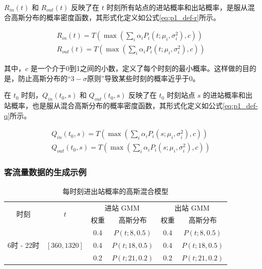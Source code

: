 \documentclass[12pt,a4paper]{mcmthesis}
\begin{document}
    $R_{in}(t)$ 和 $R_{out}(t)$ 反映了在 $t$ 时刻所有站点的进站概率和出站概率，是服从混合高斯分布的概率密度函数，其形式化定义如公式\ref{eq:p1_def-r}所示。

    \begin{equation}
        \begin{aligned}
            R_{in}(t) = T \left( \max \left( \sum_i \alpha_i P_i(t;\mu_i,\sigma^2_i), c \right) \right) \\
            R_{out}(t) = T \left( \max \left( \sum_i \alpha_i P_i(t;\mu_i,\sigma^2_i), c \right) \right)
        \end{aligned}
        \label{eq:p1_def-r}
    \end{equation}

    其中，$c$ 是一个介于0到1之间的小数，定义了每个时刻的最小概率。这样做的目的是，防止高斯分布的“$3-\sigma$原则”导致某些时刻的概率近乎于0。

    在 $t_0$ 时刻，$Q_{in}(t_0,s)$ 和 $Q_{out}(t_0,s)$ 反映了在 $t_0$ 时刻站点 $s$ 的进站概率和出站概率，也是服从混合高斯分布的概率密度函数，其形式化定义如公式\ref{eq:p1_def-q}所示。

    \begin{equation}
        \begin{aligned}
            Q_{in}(t_0,s) = T \left( \max \left( \sum_i \alpha_i P_i(s;\mu_i,\sigma^2_i), c \right) \right) \\
            Q_{out}(t_0,s) = T \left( \max \left( \sum_i \alpha_i P_i(s;\mu_i,\sigma^2_i), c \right) \right)
        \end{aligned}
        \label{eq:p1_def-q}
    \end{equation}

    \subsubsection{客流量数据的生成示例}

    \begin{table}[h]
        \centering
        \caption{每时刻进出站概率的高斯混合模型}
        \label{tab:p1_gmm-time}
        \begin{tabular}{c|c|cc|cc}
            \hline
            \multirow{2}{*}{时刻} & \multirow{2}{*}{$t$} & \multicolumn{2}{c|}{进站 GMM} & \multicolumn{2}{c}{出站 GMM} \\ \cline{3-6}
            &                         & 权重  & 高斯分布          & 权重  & 高斯分布          \\ \hline
            &                         & 0.4 & $P(t;8,0.5)$  & 0.4 & $P(t;8,0.5)$  \\
            6时 - 22时 & $\left[360,1320\right]$ & 0.4 & $P(t;18,0.5)$ & 0.4 & $P(t;18,0.5)$ \\
            &                         & 0.2 & $P(t;21,0.2)$ & 0.2 & $P(t;21,0.2)$ \\ \hline
        \end{tabular}
    \end{table}
\end{document}
